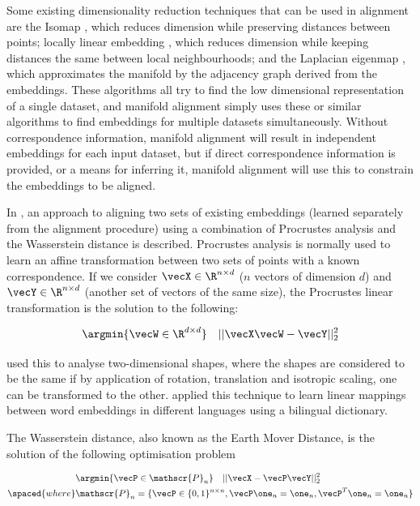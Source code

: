 Some existing dimensionality reduction techniques that can be used in alignment are the Isomap \cite{Isomap}, which reduces dimension while preserving distances between points; locally linear embedding \cite {LocallyLinearEmbedding}, which reduces dimension while keeping distances the same between local neighbourhoods; and the Laplacian eigenmap \cite{LaplacianEigenmaps}, which approximates the manifold by the adjacency graph derived from the embeddings. These algorithms all try to find the low dimensional representation of a single dataset, and manifold alignment simply uses these or similar algorithms to find embeddings for multiple datasets simultaneously. Without correspondence information, manifold alignment will result in independent embeddings for each input dataset, but if direct correspondence information is provided, or a means for inferring it, manifold alignment will use this to constrain the embeddings to be aligned. %

In \cite{UnsupervisedAlignmentWP}, an approach to aligning two sets of existing embeddings (learned separately from the alignment procedure) using a combination of Procrustes analysis and the Wasserstein distance is described. Procrustes analysis is normally used to learn an affine transformation between two sets of points with a known correspondence. If we consider $\vecX \in \R^{n \times d}$ ($n$ vectors of dimension $d$) and $\vecY \in \R^{n \times d}$ (another set of vectors of the same size), the Procrustes linear transformation is the solution to the following:

\begin{equation}
    \argmin{\vecW \in \R^{d \times d}} \quad  ||\vecX \vecW - \vecY||_2^2
\end{equation}

\cite{Goodall1991ProcrustesMI} used this to analyse two-dimensional shapes, where the shapes are considered to be the same if by application of rotation, translation and isotropic scaling, one can be transformed to the other. \cite{MikolovMachineTranslation} applied this technique to learn linear mappings between word embeddings in different languages using a bilingual dictionary. 

The Wasserstein distance, also known as the Earth Mover Distance, is the solution of the following optimisation problem

\begin{equation}
\begin{split}
    &\argmin{\vecP \in \mathscr{P}_n} \quad || \vecX - \vecP \vecY ||_2^2 \\
    \spaced{where}&\mathscr{P}_n = \{\vecP \in \{0, 1\}^{n \times n}, \vecP \one_n = \one_n, \vecP^T \one_n = \one_n \}
\end{split}
\end{equation}

